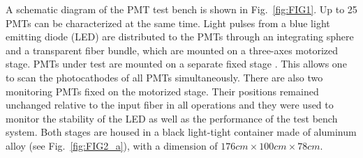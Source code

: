 \documentclass{nst}
\providecommand{\DIFadd}[1]{{\protect\color{yellow} #1}} %
\providecommand{\DIFaddbegin}{} %
\providecommand{\DIFaddend}{} %
\providecommand{\DIFdelbegin}{} %
\providecommand{\DIFdelend}{} %
\begin{document}
A schematic diagram of the PMT test bench is shown in Fig.~\ref{fig:FIG1}.
Up to 25 PMTs can be \DIFdelbegin \DIFdelend \DIFaddbegin \DIFadd{characterized }\DIFaddend at the same time.
Light pulses from a blue light emitting diode (LED) are distributed to the PMTs through an integrating sphere and a transparent fiber bundle, which are mounted on a three-axes motorized stage.
PMTs under test \DIFdelbegin \DIFdelend \DIFaddbegin \DIFadd{are }\DIFaddend mounted on a separate fixed stage\DIFdelbegin \DIFdelend \DIFaddbegin \DIFadd{. This allows one to scan the photocathodes of all PMTs }\DIFaddend simultaneously.
There are also two \DIFdelbegin \DIFdelend \DIFaddbegin \DIFadd{monitoring }\DIFaddend PMTs fixed on the motorized stage.
Their positions \DIFdelbegin \DIFdelend \DIFaddbegin \DIFadd{remained unchanged }\DIFaddend relative to the input fiber in all operations and they \DIFdelbegin \DIFdelend \DIFaddbegin \DIFadd{were }\DIFaddend used to monitor the stability of the LED as well as the performance of the test bench system.
Both stages are housed in a black light-tight container made of aluminum alloy (see Fig.~\ref{fig:FIG2_a}), with a dimension of $176cm\times100cm\times78cm$.
\end{document}
